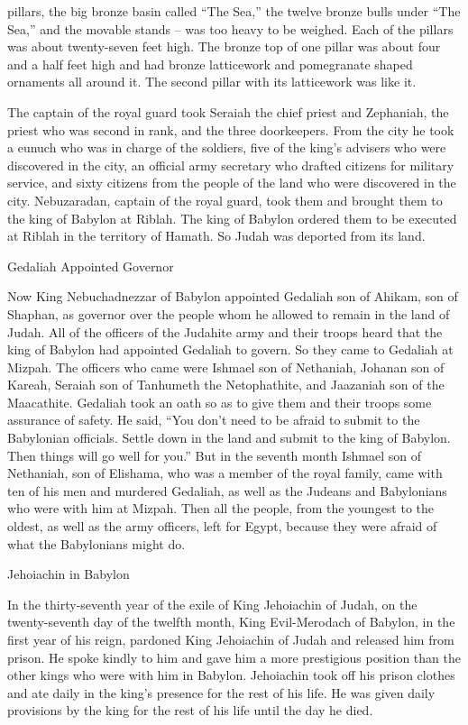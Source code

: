 {pillars,
the big bronze basin called “The Sea,” the twelve bronze bulls under “The Sea,”
and
the movable stands
– was too heavy to
be
weighed.
Each of the pillars
was about twenty-seven feet
high.
The bronze
top of
one
pillar
was about four and a half feet
high
and had bronze
latticework
and pomegranate shaped
ornaments
all
around
it. The second
pillar
with its latticework was like it.
\par }{\PP {}The captain
of the royal guard
took
Seraiah
the chief
priest
and Zephaniah,
the priest
who was second
in rank, and the
three
doorkeepers.
From
the city
he took
a eunuch
who
was in charge of
the soldiers,
five
of the king’s
advisers
who
were discovered
in the city,
an official
army
secretary
who drafted
citizens
for military service,
and sixty
citizens
from the people
of the land
who were discovered
in the city.
Nebuzaradan,
captain
of the royal guard,
took
them and brought
them to the king
of Babylon
at Riblah.
The king
of Babylon
ordered
them to be executed
at Riblah
in the territory
of Hamath.
So Judah
was deported
from its land.
\par }{\SH Gedaliah Appointed Governor
\par }{\PP {}Now
King
Nebuchadnezzar
of Babylon
appointed
Gedaliah
son
of Ahikam,
son
of Shaphan,
as governor over the people
whom
he allowed
to remain
in the land
of Judah.
All
of the officers
of the Judahite army
and their
troops
heard
that
the king
of Babylon
had appointed
Gedaliah
to govern. So they came
to
Gedaliah
at Mizpah.
The officers who came were Ishmael
son
of Nethaniah,
Johanan
son
of Kareah,
Seraiah
son
of Tanhumeth
the Netophathite,
and Jaazaniah
son
of the Maacathite.
Gedaliah
took an oath
so as to give them and their troops some assurance
of safety. He said,
“You don’t
need to be afraid
to submit to the Babylonian
officials.
Settle
down in the land
and submit
to the
king
of Babylon.
Then things will go well for you.”
But
in the seventh
month
Ishmael
son
of Nethaniah,
son
of Elishama,
who was a member
of the royal
family, came with
ten
of his men
and murdered
Gedaliah,
as well as
the
Judeans
and Babylonians
who were with
him at Mizpah.
Then
all
the people,
from the youngest
to the oldest, as
well as the army
officers,
left
for
Egypt,
because
they were afraid
of what the Babylonians might do.
\par }{\SH Jehoiachin in Babylon
\par }{\PP {}In the thirty-seventh
year
of the exile
of King
Jehoiachin
of Judah,
on the twenty-seventh
day of the twelfth
month,
King
Evil-Merodach
of Babylon,
in the first year
of his reign,
pardoned
King
Jehoiachin
of Judah
and released him from prison.
He spoke
kindly
to him
and gave
him a more prestigious
position
than the other kings
who
were with
him in Babylon.
Jehoiachin took off
his prison
clothes
and ate
daily
in the king’s presence
for the rest
of his life.
He was given
daily
provisions
by the king
for the rest of his life
until the day he died.
\par }
